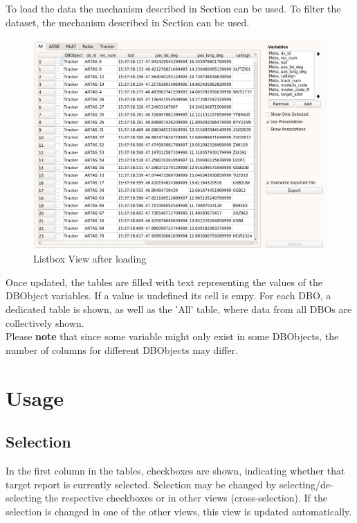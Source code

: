To load the data the mechanism described in Section  can be used. To filter the dataset, the mechanism described in Section  can be used. \\

\begin{figure}[H]
    \hspace*{-2cm}
    \includegraphics[width=18cm,frame]{../screenshots/listbox_loaded.png}
  \caption{Listbox View after loading}
\end{figure}

Once updated, the tables are filled with text representing the values of the DBObject variables.  If a value is undefined its cell is empy. For each DBO, a dedicated table is shown, as well as the 'All' table, where data from all DBOs are collectively shown. \\

Please \textbf{note} that since some variable might only exist in some DBObjects, the number of columns for different DBObjects may differ. \\

\section{Usage}

\subsection{Selection}
In the first column in the tables, checkboxes are shown, indicating whether that target report is currently selected. Selection may be changed by selecting/de-selecting the respective checkboxes or in other views (cross-selection). If the selection is changed in one of the other views, this view is updated automatically.


